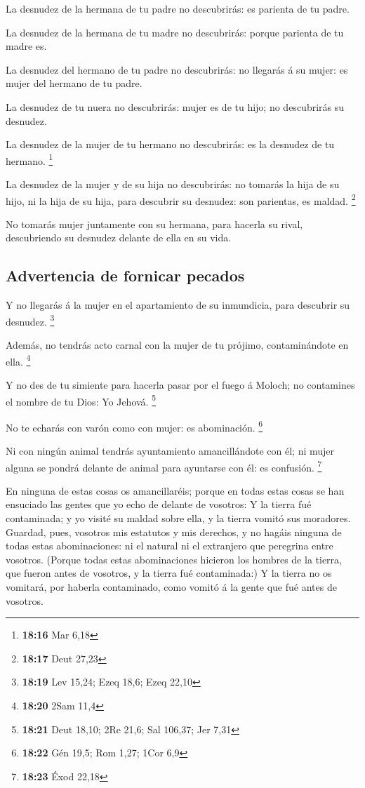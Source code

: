  La desnudez de la hermana de tu padre no descubrirás: es
parienta de tu padre.

 La desnudez de la hermana de tu madre no descubrirás:
porque parienta de tu madre es.

 La desnudez del hermano de tu padre no descubrirás: no
llegarás á su mujer: es mujer del hermano de tu padre.

 La desnudez de tu nuera no descubrirás: mujer es de tu
hijo; no descubrirás su desnudez.

 La desnudez de la mujer de tu hermano no descubrirás: es
la desnudez de tu hermano. \footnote{\textbf{18:16} Mar 6,18}

 La desnudez de la mujer y de su hija no descubrirás: no
tomarás la hija de su hijo, ni la hija de su hija, para descubrir su
desnudez: son parientas, es maldad. \footnote{\textbf{18:17} Deut 27,23}

 No tomarás mujer juntamente con su hermana, para hacerla
su rival, descubriendo su desnudez delante de ella en su vida.

\hypertarget{advertencia-de-fornicar-pecados}{%
\subsection{Advertencia de fornicar
pecados}\label{advertencia-de-fornicar-pecados}}

 Y no llegarás á la mujer en el apartamiento de su
inmundicia, para descubrir su desnudez. \footnote{\textbf{18:19} Lev
  15,24; Ezeq 18,6; Ezeq 22,10}

 Además, no tendrás acto carnal con la mujer de tu prójimo,
contaminándote en ella. \footnote{\textbf{18:20} 2Sam 11,4}

 Y no des de tu simiente para hacerla pasar por el fuego á
Moloch; no contamines el nombre de tu Dios: Yo Jehová. \footnote{\textbf{18:21}
  Deut 18,10; 2Re 21,6; Sal 106,37; Jer 7,31}

 No te echarás con varón como con mujer: es abominación.
\footnote{\textbf{18:22} Gén 19,5; Rom 1,27; 1Cor 6,9}

 Ni con ningún animal tendrás ayuntamiento amancillándote
con él; ni mujer alguna se pondrá delante de animal para ayuntarse con
él: es confusión. \footnote{\textbf{18:23} Éxod 22,18}

 En ninguna de estas cosas os amancillaréis; porque en
todas estas cosas se han ensuciado las gentes que yo echo de delante de
vosotros:  Y la tierra fué contaminada; y yo visité su
maldad sobre ella, y la tierra vomitó sus moradores. 
Guardad, pues, vosotros mis estatutos y mis derechos, y no hagáis
ninguna de todas estas abominaciones: ni el natural ni el extranjero que
peregrina entre vosotros.  (Porque todas estas
abominaciones hicieron los hombres de la tierra, que fueron antes de
vosotros, y la tierra fué contaminada:)  Y la tierra no os
vomitará, por haberla contaminado, como vomitó á la gente que fué antes
de vosotros.

